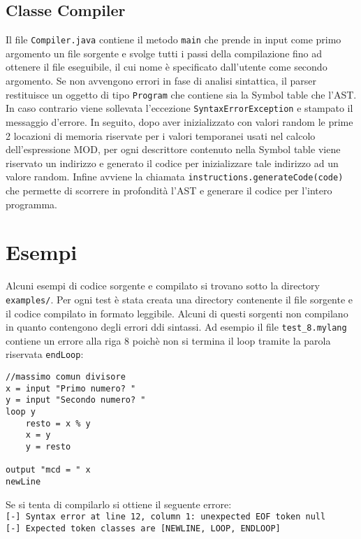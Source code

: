 \documentclass[10pt,a4paper]{article}
\begin{document}
\subsection{Classe Compiler}
Il file \texttt{Compiler.java} contiene il metodo \texttt{main} che prende in input come primo argomento un file sorgente e svolge tutti i passi della compilazione fino ad ottenere il file eseguibile, il cui nome è specificato dall'utente come secondo argomento.
Se non avvengono errori in fase di analisi sintattica, il parser restituisce un oggetto di tipo \texttt{Program} che contiene sia la Symbol table che l'AST. In caso contrario viene sollevata l'eccezione \texttt{SyntaxErrorException} e stampato il messaggio d'errore. In seguito, dopo aver inizializzato con valori random le prime 2 locazioni di memoria riservate per i valori temporanei usati nel calcolo dell'espressione MOD, per ogni descrittore contenuto nella Symbol table viene riservato un indirizzo e generato il codice per inizializzare tale indirizzo ad un valore random. Infine avviene la chiamata \texttt{instructions.generateCode(code)} che permette di scorrere in profondità l'AST e generare il codice per l'intero programma.

\section{Esempi}
Alcuni esempi di codice sorgente e compilato si trovano sotto la directory \texttt{examples/}. Per ogni test è stata creata una directory contenente il file sorgente e il codice compilato in formato leggibile. Alcuni di questi sorgenti non compilano in quanto contengono degli errori ddi sintassi. Ad esempio il file \texttt{test\_8.mylang} contiene un errore alla riga 8 poichè non si termina il loop tramite la parola riservata \texttt{endLoop}:

\lstset{numbers=left, numberstyle=\small, numbersep=8pt, frame=leftline, xleftmargin=20pt}
\lstset{basicstyle=\ttfamily,breaklines=true}
\begin{lstlisting} 
//massimo comun divisore
x = input "Primo numero? "
y = input "Secondo numero? "
loop y
    resto = x % y 
    x = y
    y = resto

output "mcd = " x
newLine
\end{lstlisting}

Se si tenta di compilarlo si ottiene il seguente errore: \\
\texttt{[-] Syntax error at line 12, column 1: unexpected EOF token null}\\
\texttt{[-] Expected token classes are [NEWLINE, LOOP, ENDLOOP]}
\end{document}
